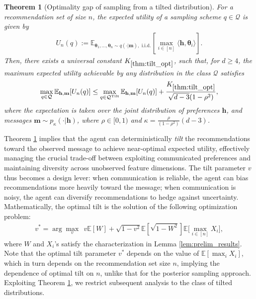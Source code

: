 \documentclass[12pt]{article}
\newtheorem{theorem}{Theorem}
\theoremstyle{definition}
\theoremstyle{remark}
\begin{document}
\begin{theorem}[Optimality gap of sampling from a tilted distribution]
\label{thm:tilt_opt}
For a recommendation set of size $n$, the expected utility of a sampling scheme $q \in \mathcal{Q}$ is given by
\begin{align*}
U_n(q) := \mathbb{E}_{\boldsymbol\theta_1, \dots, \boldsymbol\theta_n \sim q(\cdot | \mathbf{m}), \text{ i.i.d.}} \left[ \max_{i \in [n]} \langle \mathbf{h}, \boldsymbol\theta_i \rangle \right].
\end{align*}
Then, there exists a universal constant $K_{\ref{thm:tilt_opt}}$, such that, for $d \geq 4$, the maximum expected utility achievable by any distribution in the class $\mathcal{Q}$ satisfies
\begin{align*}
\max_{q \in \mathcal{Q}} \mathbb{E}_{\mathbf{h}, \mathbf{m}} [U_n(q)] \leq \max_{q \in \mathcal{Q}^{\text{Tilt}}} \mathbb{E}_{\mathbf{h}, \mathbf{m}} [U_n(q)] + \frac{K_{\ref{thm:tilt_opt}}}{\sqrt{d-3} (1-\rho^2)},
\end{align*}
where the expectation is taken over the joint distribution of preferences $\mathbf{h}$, and messages $\mathbf{m}\sim p_{\kappa}(\cdot|\mathbf{h})$, where $\rho \in [0,1)$ and $\kappa = \frac{\rho}{(1-\rho^2)} (d-3)$.
\end{theorem}

Theorem \ref{thm:tilt_opt} implies that the agent can deterministically \emph{tilt} the recommendations toward the observed message to achieve near-optimal expected utility, effectively managing the crucial trade-off between exploiting communicated preferences and maintaining diversity across unobserved feature dimensions. The tilt parameter $v$ thus becomes a design lever: when communication is reliable, the agent can bias recommendations more heavily toward the message; when communication is noisy, the agent can diversify recommendations to hedge against uncertainty. Mathematically, the optimal tilt is the solution of the following optimization problem:
\begin{align*}
    v^* = \arg\max_{v} \ \ v\mathbb E[W] + \sqrt{1-v^2} \mathbb E\left[\sqrt{1-W^2}\right] \mathbb E\Big[\max_{i\in[n]} X_i \Big],
\end{align*}
where $W$ and $X_i$'s satisfy the characterization in Lemma \ref{lem:prelim_results}. Note that the optimal tilt parameter $v^*$ depends on the value of $\mathbb E\left[\max_i X_i \right]$, which in turn depends on the recommendation set size $n$, implying the dependence of optimal tilt on $n$, unlike that for the posterior sampling approach. Exploiting Theorem \ref{thm:tilt_opt}, we restrict subsequent analysis to the class of tilted distributions.
\end{document}
